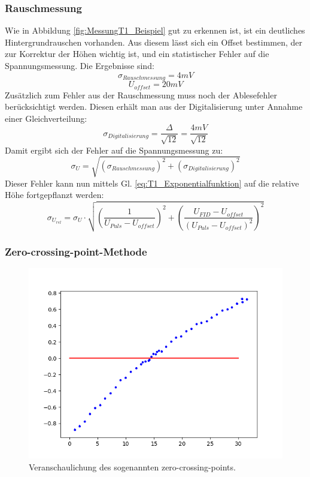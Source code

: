 \documentclass[12pt,a4paper]{article}
\begin{document}
\subsubsection{Rauschmessung}
Wie in Abbildung \ref{fig:MessungT1_Beispiel} gut zu erkennen ist, ist ein deutliches Hintergrundrauschen vorhanden. Aus diesem lässt sich ein Offset bestimmen, der zur Korrektur der Höhen wichtig ist, und ein statistischer Fehler auf die Spannungsmessung. Die Ergebnisse sind:
\begin{equation*}
\sigma _{Rauschmessung} = 4 mV
\end{equation*}
\begin{equation*}
U_{offset} = 20 mV
\end{equation*}
Zusätzlich zum Fehler aus der Rauschmessung muss noch der Ablesefehler berücksichtigt werden. Diesen erhält man aus der Digitalisierung unter Annahme einer Gleichverteilung:
\begin{equation*}
\sigma _{Digitalisierung} = \dfrac{\Delta}{\sqrt{12}} = \dfrac{4 mV}{\sqrt{12}}
\end{equation*}
Damit ergibt sich der Fehler auf die Spannungsmessung zu:
\begin{equation*}
\sigma _U = \sqrt{\left(\sigma _{Rauschmessung} \right)^2 + \left(\sigma _{Digitalisierung} \right)^2}
\end{equation*}
Dieser Fehler kann nun mittels Gl. \ref{eq:T1_Exponentialfunktion} auf die relative Höhe fortgepflanzt werden:
\begin{equation*}
\sigma _{U_{rel}} = \sigma _U \cdot \sqrt{\left(\dfrac{1}{U_{Puls} - U_{offset}}\right)^2 + \left(\dfrac{U_{FID} - U_{offset}}{(U_{Puls} - U_{offset})^2}\right)^2}
\end{equation*}


\subsubsection{Zero-crossing-point-Methode}

\begin{figure}
\centering
\includegraphics[scale=0.7]{Bilder/T1_ZeroCrossingPoint.PNG}
\caption{Veranschaulichung des sogenannten zero-crossing-points.}
\label{fig:T1_Zero_Crossing}
\end{figure}
\end{document}
